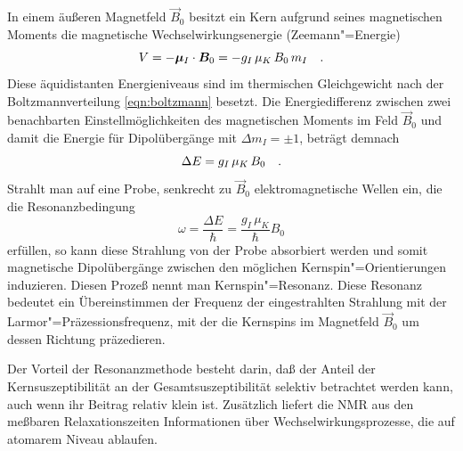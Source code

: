 In einem äußeren Magnetfeld $\vec B_0$ besitzt ein Kern aufgrund seines magnetischen Moments die
magnetische Wechselwirkungsenergie (Zeemann"=Energie)
	\[
		V=-\bm \mu_I\cdot\bm B_0=-g_I\,\mu_K\,B_0\,m_I\quad\text{.}
	\]
Diese äquidistanten Energieniveaus sind im thermischen Gleichgewicht nach der Boltzmannverteilung
\eqref{eqn:boltzmann} besetzt. Die Energiedifferenz zwischen zwei benachbarten
Einstellmöglichkeiten des magnetischen Moments im Feld $\vec B_0$ und damit die Energie für Dipolübergänge
mit $\Delta m_I=\pm1$, beträgt demnach
	\[
		\Delta E=g_I\,\mu_K\,B_0\quad\text{.}
	\]
Strahlt man auf eine Probe, senkrecht zu $\vec B_0$ elektromagnetische Wellen ein, die die
Resonanzbedingung
	\begin{equation}
		\label{eqn:resonanzbed}
		\omega=\frac{\Delta E}{\hbar}=\frac{g_I\,\mu_K}{\hbar}B_0
	\end{equation}
erfüllen, so kann diese Strahlung von der Probe absorbiert werden und somit magnetische
Dipolübergänge zwischen den möglichen Kernspin"=Orientierungen induzieren. Diesen Prozeß nennt man
Kernspin"=Resonanz. Diese Resonanz bedeutet ein Übereinstimmen der Frequenz der eingestrahlten
Strahlung mit der Larmor"=Präzessionsfrequenz, mit der die Kernspins im Magnetfeld $\vec B_0$ um
dessen Richtung präzedieren.

Der Vorteil der Resonanzmethode besteht darin, daß der Anteil der Kernsuszeptibilität an der
Gesamtsuszeptibilität selektiv betrachtet werden kann, auch wenn ihr Beitrag relativ klein ist.
Zusätzlich liefert die NMR aus den meßbaren Relaxationszeiten Informationen über
Wechselwirkungsprozesse, die auf atomarem Niveau ablaufen.

